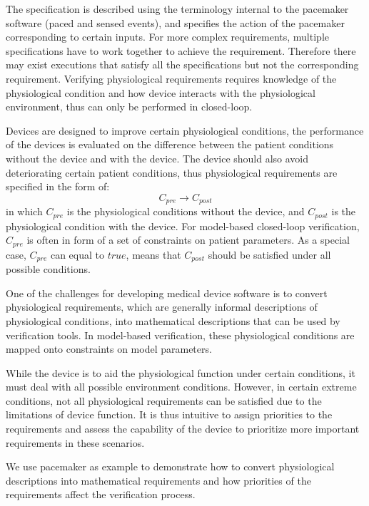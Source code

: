 The specification is described using the terminology internal to the pacemaker software (paced and sensed events), and specifies the action of the pacemaker corresponding to certain inputs. For more complex requirements, multiple specifications have to work together to achieve the requirement. Therefore there may exist executions that satisfy all the specifications but not the corresponding requirement. Verifying physiological requirements requires knowledge of the physiological condition and how device interacts with the physiological environment, thus can only be performed in closed-loop. 

Devices are designed to improve certain physiological conditions, the performance of the devices is evaluated on the difference between the patient conditions without the device and with the device. The device should also avoid deteriorating certain patient conditions, thus physiological requirements are specified in the form of:
$$C_{pre}\rightarrow C_{post}$$
in which $C_{pre}$ is the physiological conditions without the device,  and $C_{post}$ is the physiological condition with the device. For model-based closed-loop verification, $C_{pre}$ is often in form of a set of constraints on patient parameters. As a special case, $C_{pre}$ can equal to $true$, means that $C_{post}$ should be satisfied under all possible conditions.

One of the challenges for developing medical device software is to convert physiological requirements, which are generally informal descriptions of physiological conditions, into mathematical descriptions that can be used by verification tools.  In model-based verification, these physiological conditions are mapped onto constraints on model parameters. %

While the device is to aid the physiological function under certain conditions, it must deal with all possible environment conditions. However, in certain extreme conditions, not all physiological requirements can be satisfied due to the limitations of device function. It is thus intuitive to assign priorities to the requirements and assess the capability of the device to prioritize more important requirements in these scenarios. 

We use pacemaker as example to demonstrate how to convert physiological descriptions into mathematical requirements and how priorities of the requirements affect the verification process.

